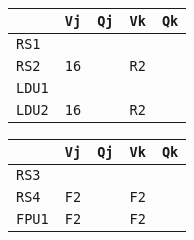\begin{enumerate}
    \begin{minipage}{0.45\textwidth}
        \centering
        \begin{tabular}{@{} l | l l l l @{}}
            \toprule
                & \texttt{Vj} & \texttt{Qj} & \texttt{Vk} & \texttt{Qk} \\
            \midrule
            \texttt{RS1} & & & & \\ [.3em]
            \texttt{RS2} & \texttt{16} & & \texttt{R2} & \\
            \cmidrule{1-5}
            \texttt{LDU1} & & & & \\ [.3em]
            \texttt{LDU2} & \texttt{16} & & \texttt{R2} & \\
            \bottomrule
        \end{tabular}
    \end{minipage}
    \hfill
    \begin{minipage}{0.45\textwidth}
        \centering
        \begin{tabular}{@{} l | l l l l @{}}
            \toprule
            & \texttt{Vj} & \texttt{Qj} & \texttt{Vk} & \texttt{Qk} \\
            \midrule
            \texttt{RS3} & & & & \\ [.3em]
            \texttt{RS4} & \texttt{F2} & & \texttt{F2} & \\
            \cmidrule{1-5}
            \texttt{FPU1} & \texttt{F2} & & \texttt{F2} & \\
            \bottomrule
        \end{tabular}
    \end{minipage}


\end{enumerate}
